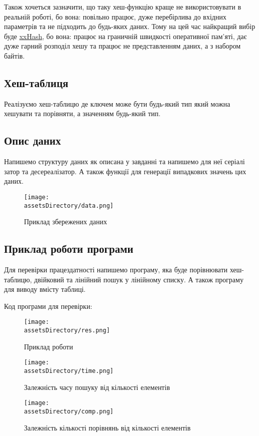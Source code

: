 Також хочеться зазначити, що таку хеш-функцію краще не використовувати в реальній роботі,
бо вона: повільно працює, дуже перебірлива до вхідних параметрів та не підходить до будь-яких даних.
Тому на цей час найкращий вибір буде \href{https://github.com/Cyan4973/xxHash}{xxHash}, бо вона:
працює на граничній швидкості оперативної пам'яті,
дає дуже гарний розподіл хешу та
працює не представленням даних, а з набором байтів.


\newpage
\subsection{Хеш-таблиця}
Реалізуємо хеш-таблицю де ключем може бути будь-який тип який можна хешувати та порівняти, а значенням будь-який тип.



\newpage
\subsection{Опис даних}
Напишемо структуру даних як описана у завданні та напишемо для неї серіалі затор та десереалізатор.
А також функції для генерації випадкових значень цих даних.


\begin{figure}[ht!]
    \centering
    \texttt{[image: \\assetsDirectory/data.png]}
    \caption{Приклад збережених даних}
\end{figure}

\newpage
\subsection{Приклад роботи програми}
Для перевірки працездатності напишемо програму, яка буде порівнювати хеш-таблицю, двійковий та лінійний пошук у лінійному списку.
А також програму для виводу вмісту таблиці.

\noindent
Код програми для перевірки:



\begin{figure}[ht!]
    \centering
    \texttt{[image: \\assetsDirectory/res.png]}
    \caption{Приклад роботи}
\end{figure}

\begin{figure}[ht!]
    \centering
    \texttt{[image: \\assetsDirectory/time.png]}
    \caption{Залежність часу пошуку від кількості елементів}
\end{figure}
\begin{figure}[ht!]
    \centering
    \texttt{[image: \\assetsDirectory/comp.png]}
    \caption{Залежність кількості порівнянь від кількості елементів}
\end{figure}



